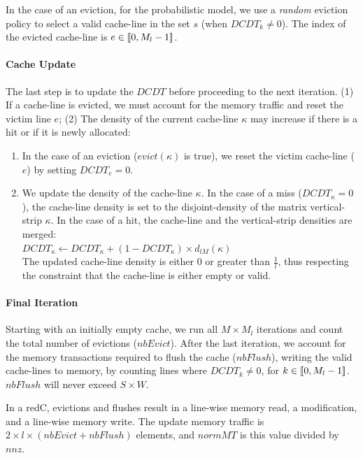 In the case of an \gls{eviction}, for the probabilistic model, we use a \textit{random} \gls{eviction} policy to select a valid cache-line in the \gls{set} $s$ (when $\mathit{DCDT}_k \ne 0$).
The index of the evicted cache-line is $e \in [\![0, M_l-1]\!]$.

\paragraph{Cache Update}
The last step is to update the $\mathit{DCDT}$ before proceeding to the next iteration.
(1) If a cache-line is evicted, we must account for the memory traffic and reset the victim line $e$;
(2) The density of the current cache-line $\kappa$ may increase if there is a \gls{hit} or if it is newly allocated:
\begin{enumerate}
    \item In the case of an \gls{eviction} ($\mathit{evict}(\kappa)$ is true), we reset the victim cache-line ($e$) by setting $\mathit{DCDT}_e = 0$.
    \item We update the density of the cache-line $\kappa$.
    In the case of a \gls{miss} ($\mathit{DCDT}_\kappa = 0$), the cache-line density is set to the disjoint-density of the matrix vertical-strip $\kappa$.
    In the case of a \gls{hit}, the cache-line and the vertical-strip densities are merged: \\
    $\mathit{DCDT}_\kappa \gets \mathit{DCDT}_\kappa + (1 - \mathit{DCDT}_\kappa) \times d_\mathit{lM}(\kappa)$ \\
    The updated cache-line density is either $0$ or greater than $\frac{1}{l}$, thus respecting the constraint that the cache-line is either empty or valid.
\end{enumerate}

\paragraph{Final Iteration}
Starting with an initially empty cache, we run all $M \times M_l$ iterations and count the total number of \glspl{eviction} ($\mathit{nbEvict}$).
After the last iteration, we account for the memory transactions required to flush the cache ($\mathit{nbFlush}$), writing the valid cache-lines to memory, by counting lines where $\mathit{DCDT}_k \ne 0$, for $k \in [\![0, M_l-1]\!]$.
$\mathit{nbFlush}$ will never exceed \mbox{$S \times W$}.

In a \gls{redC}, \glspl{eviction} and flushes result in a line-wise memory read, a modification, and a line-wise memory write.
The update memory traffic is $2 \times l \times (\mathit{nbEvict} + \mathit{nbFlush})$ elements, and $\mathit{normMT}$ is this value divided by $\mathit{nnz}$.

